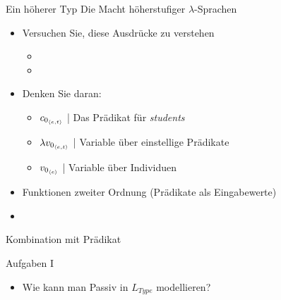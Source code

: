\begin{frame}
  {Ein höherer Typ}
  \onslide<+->
  \onslide<+->
  Die Macht höherstufiger $\lambda$-Sprachen\\
  \Zeile 
  \begin{itemize}[<+->]
    \item Versuchen Sie, diese Ausdrücke zu verstehen
      \begin{itemize}[<+->]
        \item {}
        \item {}
      \end{itemize}
    \item Denken Sie daran:
      \begin{itemize}[<+->]
        \item $c_{0_{{\langle{}e,t\rangle}}}$ | Das Prädikat für \textit{students}
        \item $\lambda{}v_{0_{{\langle{}e,t\rangle}}}$ | Variable über einstellige Prädikate
        \item $v_{0_{{\langle{}e\rangle}}}$ | Variable über Individuen
      \end{itemize}
      \Halbzeile
    \item \alert{Funktionen zweiter Ordnung} (Prädikate als Eingabewerte) 
      \Halbzeile
      \onslide<+->
    \item {}
  \end{itemize}
\end{frame}

\begin{frame}
  {Kombination mit Prädikat}
  \onslide<+->
  \onslide<+->
  \centering 
\end{frame}


\begin{frame}
  {Aufgaben I}
  \\
  \Zeile
  \onslide<+->
  \begin{itemize}[<+->]
  \item Wie kann man Passiv in $L_{Type}$ modellieren?
  \end{itemize}
\end{frame}
